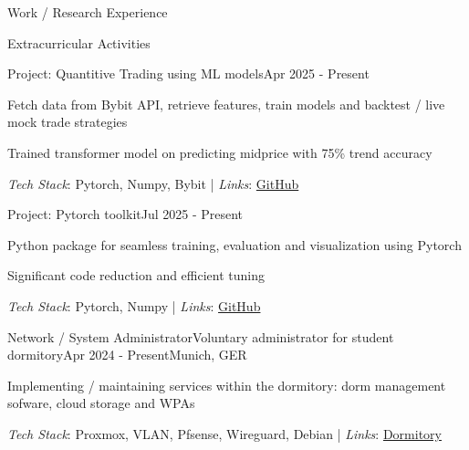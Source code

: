 \documentclass{kyvernitis-resume}
\begin{document}
\begin{section}{Work / Research Experience}
    

  
\end{section}
\begin{section}{Extracurricular Activities}
     
    \begin{subsectionnosl}{Project: Quantitive Trading using ML models}{Apr 2025 - Present}
     \item{Fetch data from Bybit API, retrieve features, train models and backtest / live mock trade strategies}
     \item{Trained transformer model on predicting midprice with 75\% trend accuracy}
     \end{subsectionnosl}
    \textit{Tech Stack}: Pytorch, Numpy, Bybit\hspace{0.1cm} | \hspace{0.1cm}
    \textit{Links}: \href{https://github.com/noahpy/my_ml_crypto_trading}{GitHub}

    \begin{subsectionnosl}{Project: Pytorch toolkit}{Jul 2025 - Present}
     \item{Python package for seamless training, evaluation and visualization using Pytorch}
     \item{Significant code reduction and efficient tuning}
     \end{subsectionnosl}
    \textit{Tech Stack}: Pytorch, Numpy \hspace{0.1cm} | \hspace{0.1cm}
    \textit{Links}: \href{https://github.com/noahpy/my_pytorch_kit}{GitHub}

     \begin{subsection}{Network / System Administrator}{Voluntary administrator for student dormitory}{Apr 2024 - Present}{Munich, GER}
     \item{Implementing / maintaining services within the dormitory: dorm management sofware, cloud storage and WPAs}
     \end{subsection}
    \textit{Tech Stack}: Proxmox, VLAN, Pfsense, Wireguard, Debian\hspace{0.1cm} | \hspace{0.1cm}
    \textit{Links}: \href{https://www.schollheim.net/}{Dormitory}
    



\end{section}
\end{document}
